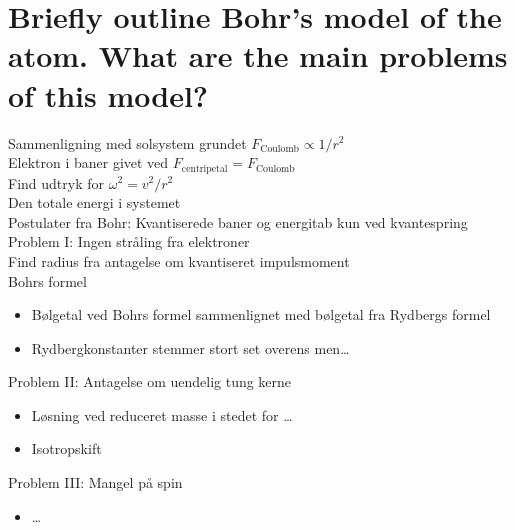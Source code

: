 \section[Bohrs atommodel]{Briefly outline Bohr's model of the atom. What are the main problems of this model?}

\noindent
\large
Sammenligning med solsystem grundet $F_\text{Coulomb} \propto 1/r^2$\\
Elektron i baner givet ved $F_\text{centripetal} = F_\text{Coulomb}$\\
Find udtryk for $\omega^2 = v^2/r^2$\\
Den totale energi i systemet\\
Postulater fra Bohr: Kvantiserede baner og energitab kun ved kvantespring\\
Problem I: Ingen stråling fra elektroner\\
Find radius fra antagelse om kvantiseret impulsmoment\\
Bohrs formel
\begin{itemize}
    \item Bølgetal ved Bohrs formel sammenlignet med bølgetal fra Rydbergs formel
    \item Rydbergkonstanter stemmer stort set overens men\ldots
\end{itemize}
Problem II: Antagelse om uendelig tung kerne
\begin{itemize}
    \item Løsning ved reduceret masse i stedet for \ldots
    \item Isotropskift
\end{itemize}
Problem III: Mangel på spin
\begin{itemize}
    \item \ldots
\end{itemize}
\normalsize
